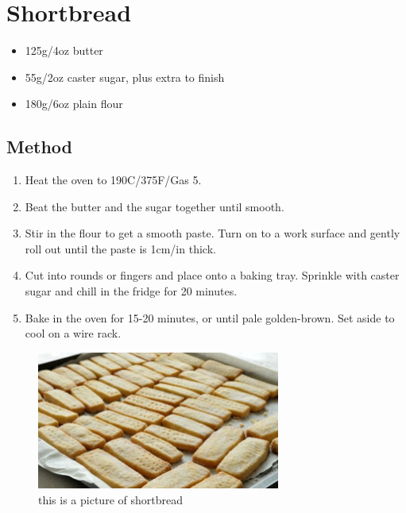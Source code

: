 
\section{Shortbread}

\begin{itemize}
	\item 125g/4oz butter
	\item 55g/2oz caster sugar, plus extra to finish
	\item 180g/6oz plain flour
\end{itemize}

\subsection{Method}

\begin{enumerate}
\item Heat the oven to 190C/375F/Gas 5.
\item Beat the butter and the sugar together until smooth.
\item Stir in the flour to get a smooth paste. Turn on to a work surface and gently roll out until the paste is 1cm/in thick.
\item Cut into rounds or fingers and place onto a baking tray. Sprinkle with caster sugar and chill in the fridge for 20 minutes.
\item Bake in the oven for 15-20 minutes, or until pale golden-brown. Set aside to cool on a wire rack.
\end{enumerate}

\begin{figure}[h]
\includegraphics[width=8cm]{shortbread}
\caption{this is a picture of shortbread}
\end{figure}
